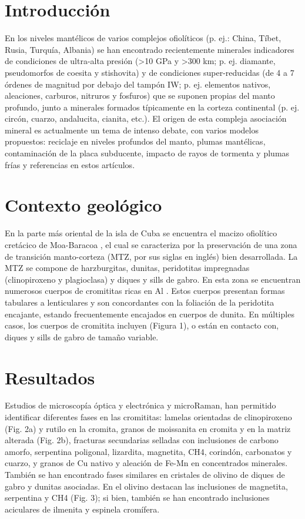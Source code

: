 \documentclass[a4paper,11pt]{article}
\begin{document}
	\begin{multicols}{2}
		\section{Introducción}
		En los niveles mantélicos de varios complejos ofiolíticos (p. ej.: China, Tíbet, Rusia, Turquía, Albania) se han encontrado recientemente minerales indicadores de condiciones de ultra-alta presión (\textgreater10 GPa y \textgreater300 km; p. ej. diamante, pseudomorfos de coesita y stishovita) y de condiciones super-reducidas (de 4 a 7 órdenes de magnitud por debajo del tampón IW; p. ej. elementos nativos, aleaciones, carburos, nitruros y fosfuros) que se suponen propias del manto profundo, junto a minerales formados típicamente en la corteza continental (p. ej. circón, cuarzo, andalucita, cianita, etc.). El origen de esta compleja asociación mineral es actualmente un tema de intenso debate, con varios modelos propuestos: reciclaje en niveles profundos del manto, plumas mantélicas, contaminación de la placa subducente, impacto de rayos de tormenta y plumas frías \cite{Pujol-Sola2018,Xiong} y referencias en estos artículos. 
		\section{Contexto geológico}
		En la parte más oriental de la isla de Cuba se encuentra el macizo ofiolítico cretácico de Moa-Baracoa \cite{Iturralde}, el cual se caracteriza por la preservación de una zona de transición manto-corteza (MTZ, por sus siglas en inglés) bien desarrollada. La MTZ se compone de harzburgitas, dunitas, peridotitas impregnadas (clinopiroxeno y plagioclasa) y diques y sills de gabro. En esta zona se encuentran numerosos cuerpos de cromititas ricas en Al \cite{Proenza1999}. Estos cuerpos presentan formas tabulares a lenticulares y son concordantes con la foliación de la peridotita encajante, estando frecuentemente encajados en cuerpos de dunita. En múltiples casos, los cuerpos de cromitita incluyen (Figura 1), o están en contacto con, diques y sills de gabro de tamaño variable.
	
		\section{Resultados}
		Estudios de microscopía óptica y electrónica y microRaman, han permitido identificar diferentes fases en las cromititas: lamelas orientadas de clinopiroxeno (Fig. 2a) y rutilo en la cromita, granos de moissanita en cromita y en la matriz alterada (Fig. 2b), fracturas secundarias selladas con inclusiones de carbono amorfo, serpentina poligonal, lizardita, magnetita, CH4, corindón, carbonatos y cuarzo, y granos de Cu nativo y aleación de Fe-Mn en concentrados minerales. 
		También se han encontrado fases similares en cristales de olivino de diques de gabro y dunitas asociadas. En el olivino destacan las inclusiones de magnetita, serpentina y CH4 (Fig. 3); si bien, también se han encontrado inclusiones aciculares de ilmenita y espinela cromífera.
		

\end{multicols}
\end{document}

